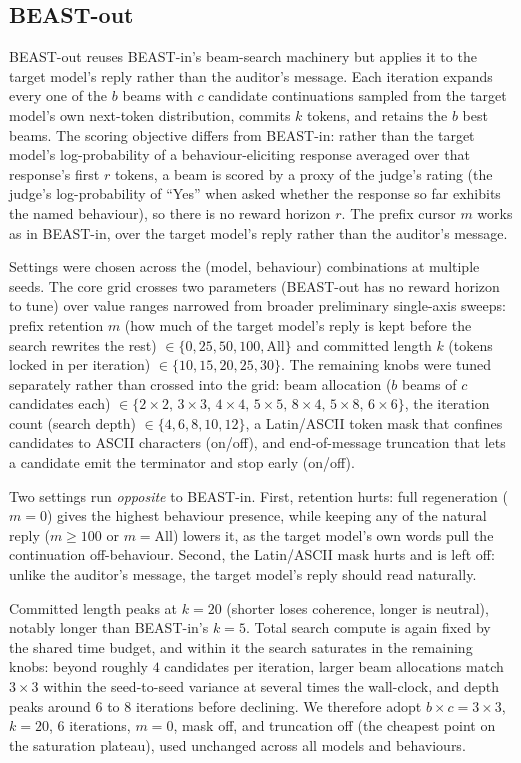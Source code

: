 \documentclass{article}
\theoremstyle{plain}
\theoremstyle{definition}
\theoremstyle{remark}
\begin{document}
\subsection{BEAST-out}
BEAST-out reuses BEAST-in's beam-search machinery but applies it to the target model's reply rather than the auditor's message. Each iteration expands every one of the $b$ beams with $c$ candidate continuations sampled from the target model's own next-token distribution, commits $k$ tokens, and retains the $b$ best beams. The scoring objective differs from BEAST-in: rather than the target model's log-probability of a behaviour-eliciting response averaged over that response's first $r$ tokens, a beam is scored by a proxy of the judge's rating (the judge's log-probability of ``Yes'' when asked whether the response so far exhibits the named behaviour), so there is no reward horizon $r$. The prefix cursor $m$ works as in BEAST-in, over the target model's reply rather than the auditor's message.

Settings were chosen across the (model, behaviour) combinations at multiple seeds. The core grid crosses two parameters (BEAST-out has no reward horizon to tune) over value ranges narrowed from broader preliminary single-axis sweeps: prefix retention $m$ (how much of the target model's reply is kept before the search rewrites the rest) $\in \{0, 25, 50, 100, \text{All}\}$ and committed length $k$ (tokens locked in per iteration) $\in \{10, 15, 20, 25, 30\}$. The remaining knobs were tuned separately rather than crossed into the grid: beam allocation ($b$ beams of $c$ candidates each) $\in \{2\times2,\,3\times3,\,4\times4,\,5\times5,\,8\times4,\,5\times8,\,6\times6\}$, the iteration count (search depth) $\in \{4, 6, 8, 10, 12\}$, a Latin/ASCII token mask that confines candidates to ASCII characters (on/off), and end-of-message truncation that lets a candidate emit the terminator and stop early (on/off).

Two settings run \emph{opposite} to BEAST-in. First, retention hurts: full regeneration ($m = 0$) gives the highest behaviour presence, while keeping any of the natural reply ($m \ge 100$ or $m = \text{All}$) lowers it, as the target model's own words pull the continuation off-behaviour. Second, the Latin/ASCII mask hurts and is left off: unlike the auditor's message, the target model's reply should read naturally.

Committed length peaks at $k = 20$ (shorter loses coherence, longer is neutral), notably longer than BEAST-in's $k = 5$. Total search compute is again fixed by the shared time budget, and within it the search saturates in the remaining knobs: beyond roughly $4$ candidates per iteration, larger beam allocations match $3 \times 3$ within the seed-to-seed variance at several times the wall-clock, and depth peaks around $6$ to $8$ iterations before declining. We therefore adopt $b \times c = 3 \times 3$, $k = 20$, $6$ iterations, $m = 0$, mask off, and truncation off (the cheapest point on the saturation plateau), used unchanged across all models and behaviours.
\end{document}
